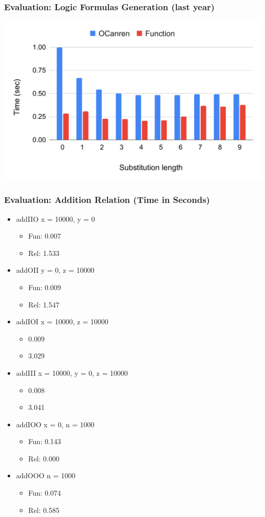 \documentclass[xcolor=table]{beamer}
\begin{document}
\begin{frame}[fragile]
  \frametitle{Evaluation: Logic Formulas Generation (last year)}
  \includegraphics[width=\textwidth]{fig/eval/prop.pdf}
\end{frame}


\begin{frame}[fragile]
  \frametitle{Evaluation: Addition Relation (Time in Seconds)}
\begin{itemize}
  \item addIIO x = 10000, y = 0
  \begin{itemize}
    \item Fun: 0.007
    \item Rel: 1.533
  \end{itemize}
  \item addOII y = 0, z = 10000
  \begin{itemize}
    \item Fun: 0.009
    \item Rel: 1.547
  \end{itemize}
  \item addIOI x = 10000, z = 10000
  \begin{itemize}
    \item 0.009
    \item 3.029
  \end{itemize}
  \item addIII x = 10000, y = 0, z = 10000
  \begin{itemize}
    \item 0.008
    \item 3.041
  \end{itemize}
  \item addIOO x = 0, n = 1000
  \begin{itemize}
    \item Fun: 0.143
    \item Rel: 0.000
  \end{itemize}
  \item addOOO n = 1000
  \begin{itemize}
    \item Fun: 0.074
    \item Rel: 0.585
  \end{itemize}
\end{itemize}
\end{frame}
\end{document}
